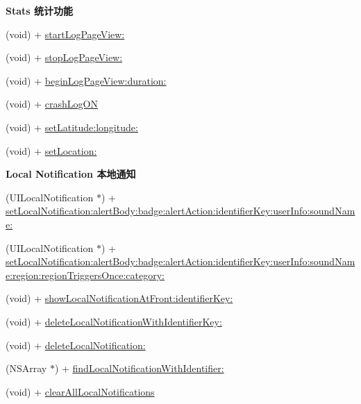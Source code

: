 \begin{Indent}\textbf{ Stats 统计功能}\par
{\em 

 

 }\begin{DoxyCompactItemize}
\item 
(void) + \mbox{\hyperlink{interface_j_p_u_s_h_service_a02b4f0cc1cdeb640b38850840d9d285d}{start\+Log\+Page\+View\+:}}
\item 
(void) + \mbox{\hyperlink{interface_j_p_u_s_h_service_ab86f867ba03f2be249784a9f2e703f69}{stop\+Log\+Page\+View\+:}}
\item 
(void) + \mbox{\hyperlink{interface_j_p_u_s_h_service_a3460a947b8d147f41c9942e1f2dc0288}{begin\+Log\+Page\+View\+:duration\+:}}
\item 
(void) + \mbox{\hyperlink{interface_j_p_u_s_h_service_a6c2aee92bdedee92fa820e1b39b8e5de}{crash\+Log\+ON}}
\item 
(void) + \mbox{\hyperlink{interface_j_p_u_s_h_service_a05825c4d2424a0236f560aff984f1c50}{set\+Latitude\+:longitude\+:}}
\item 
(void) + \mbox{\hyperlink{interface_j_p_u_s_h_service_a8f3c37f1d5e52c913410e94a0cc76f14}{set\+Location\+:}}
\end{DoxyCompactItemize}
\end{Indent}
\begin{Indent}\textbf{ Local Notification 本地通知}\par
{\em 

 

 }\begin{DoxyCompactItemize}
\item 
(U\+I\+Local\+Notification $\ast$) + \mbox{\hyperlink{interface_j_p_u_s_h_service_a4b5b624f876845be5bde8dbfec2a4732}{set\+Local\+Notification\+:alert\+Body\+:badge\+:alert\+Action\+:identifier\+Key\+:user\+Info\+:sound\+Name\+:}}
\item 
(U\+I\+Local\+Notification $\ast$) + \mbox{\hyperlink{interface_j_p_u_s_h_service_a3fe29feeeb2f497fab6cd5d5c3d2cd88}{set\+Local\+Notification\+:alert\+Body\+:badge\+:alert\+Action\+:identifier\+Key\+:user\+Info\+:sound\+Name\+:region\+:region\+Triggers\+Once\+:category\+:}}
\item 
(void) + \mbox{\hyperlink{interface_j_p_u_s_h_service_a0d0d9358bf5625cb55f689c522bd1d00}{show\+Local\+Notification\+At\+Front\+:identifier\+Key\+:}}
\item 
(void) + \mbox{\hyperlink{interface_j_p_u_s_h_service_a9383bccd2a6b50aa70c6bdfcd8072a51}{delete\+Local\+Notification\+With\+Identifier\+Key\+:}}
\item 
(void) + \mbox{\hyperlink{interface_j_p_u_s_h_service_a8a339f1cf749a4bc1be1b13cf865378a}{delete\+Local\+Notification\+:}}
\item 
(N\+S\+Array $\ast$) + \mbox{\hyperlink{interface_j_p_u_s_h_service_adceb39b009c27d29cfe19d2afade75ec}{find\+Local\+Notification\+With\+Identifier\+:}}
\item 
(void) + \mbox{\hyperlink{interface_j_p_u_s_h_service_aa0147bec665d5c8b76a954169288b2b0}{clear\+All\+Local\+Notifications}}
\end{DoxyCompactItemize}
\end{Indent}
